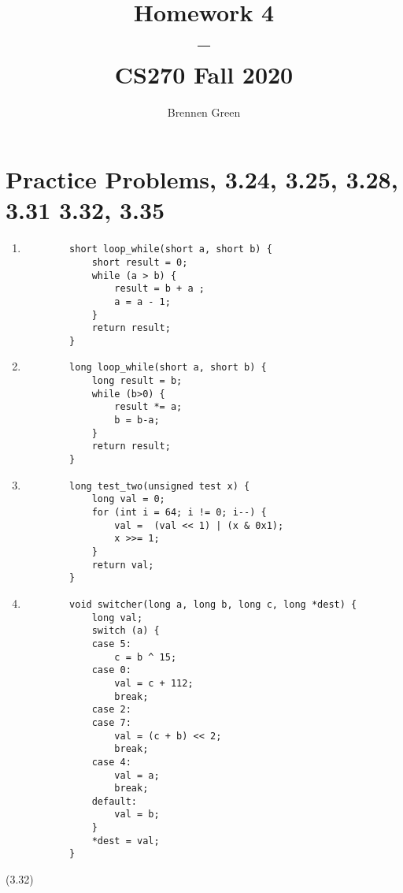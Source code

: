 \documentclass[11pt]{article}
\begin{document}
\title{Homework 4\\--\\\large CS270 Fall 2020}
\date{}
\author{Brennen Green}
\maketitle

\section{Practice Problems, 3.24, 3.25, 3.28, 3.31 3.32, 3.35}
\begin{enumerate}
	\item[(3.24)] \begin{verbatim}
		short loop_while(short a, short b) {
		    short result = 0;
		    while (a > b) {
		        result = b + a ;
		        a = a - 1;
		    }
		    return result;
		}
	\end{verbatim}
	\item[(3.25)] \begin{verbatim}
		long loop_while(short a, short b) {
		    long result = b;
		    while (b>0) {
		        result *= a;
		        b = b-a;
		    }
		    return result;
		}
	\end{verbatim}
	
	\item[(3.28)] \begin{verbatim}
		long test_two(unsigned test x) {
			long val = 0;
			for (int i = 64; i != 0; i--) {
			    val =  (val << 1) | (x & 0x1);
			    x >>= 1;
			}
			return val;
		}
	\end{verbatim}

	\item[(3.31)] \begin{verbatim}
		void switcher(long a, long b, long c, long *dest) {
		    long val;
		    switch (a) {
		    case 5:
		        c = b ^ 15;
		    case 0:
		        val = c + 112;
		        break;
		    case 2:
		    case 7:
		        val = (c + b) << 2;
		        break;
		    case 4:
		        val = a;
		        break;
		    default:
		        val = b;
		    }
		    *dest = val;
		}
	\end{verbatim}
	\end{enumerate}
	(3.32)
\end{document}
